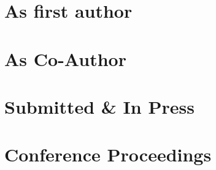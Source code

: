 \documentclass[margin]{res}
\begin{document}

\address{\Large{\textbf{Publication List}}}
\address{}


\begin{resume}

\section{As first author}
\begin{itemize}

\end{itemize}
\section{As Co-Author}
\begin{itemize}

\end{itemize}
\section{Submitted \& In Press}
\begin{itemize}

\end{itemize}
\section{Conference Proceedings}
\begin{itemize}

 \end{itemize}
\end{resume}
\end{document}
